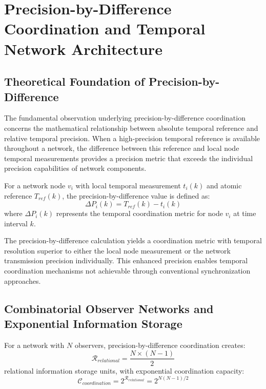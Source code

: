 \documentclass[11pt,a4paper]{article}
\begin{document}
\section{Precision-by-Difference Coordination and Temporal Network Architecture}

\subsection{Theoretical Foundation of Precision-by-Difference}

The fundamental observation underlying precision-by-difference coordination concerns the mathematical relationship between absolute temporal reference and relative temporal precision. When a high-precision temporal reference is available throughout a network, the difference between this reference and local node temporal measurements provides a precision metric that exceeds the individual precision capabilities of network components.

\begin{definition}
For a network node $v_i$ with local temporal measurement $t_i(k)$ and atomic reference $T_{ref}(k)$, the precision-by-difference value is defined as:
\begin{equation}
\Delta P_i(k) = T_{ref}(k) - t_i(k)
\label{eq:precision_difference}
\end{equation}
where $\Delta P_i(k)$ represents the temporal coordination metric for node $v_i$ at time interval $k$.
\end{definition}

The precision-by-difference calculation yields a coordination metric with temporal resolution superior to either the local node measurement or the network transmission precision individually. This enhanced precision enables temporal coordination mechanisms not achievable through conventional synchronization approaches.

\subsection{Combinatorial Observer Networks and Exponential Information Storage}

\begin{theorem}
For a network with $N$ observers, precision-by-difference coordination creates:
\begin{equation}
\mathcal{R}_{relational} = \frac{N \times (N-1)}{2}
\end{equation}
relational information storage units, with exponential coordination capacity:
\begin{equation}
\mathcal{C}_{coordination} = 2^{\mathcal{R}_{relational}} = 2^{N(N-1)/2}
\end{equation}
\end{theorem}
\end{document}
